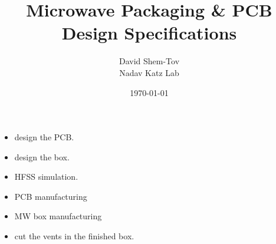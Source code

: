 \documentclass[11pt,a4paper]{article}
\title{\textbf{Microwave Packaging \& PCB Design Specifications}}
\author{David Shem-Tov\\{\small Nadav Katz Lab}}
\date{\today}
\newcommand{\boxedsymbol}[2][1em]{%
  \begingroup
  \setlength{\fboxsep}{0pt}
  \framebox{%
    \makebox[#1][c]{%
      \rule[-0.25\dimexpr#1\relax]{0pt}{#1}%
      #2%
    }%
  }%
  \endgroup
}
\newcommand{\notstarted}{\boxedsymbol{}}
\newcommand{\inprogress}{\textcolor{blue}{\boxedsymbol{$\rightarrow$}}}
\begin{document}
\maketitle

\begin{itemize}
    \item[\inprogress] design the PCB.
    \item[\inprogress] design the box.
    \item[\inprogress] HFSS simulation.
    \item[\notstarted] PCB manufacturing
    \item[\notstarted] MW box manufacturing
    \item[\notstarted] cut the vents in the finished box.
\end{itemize}





\end{document}
